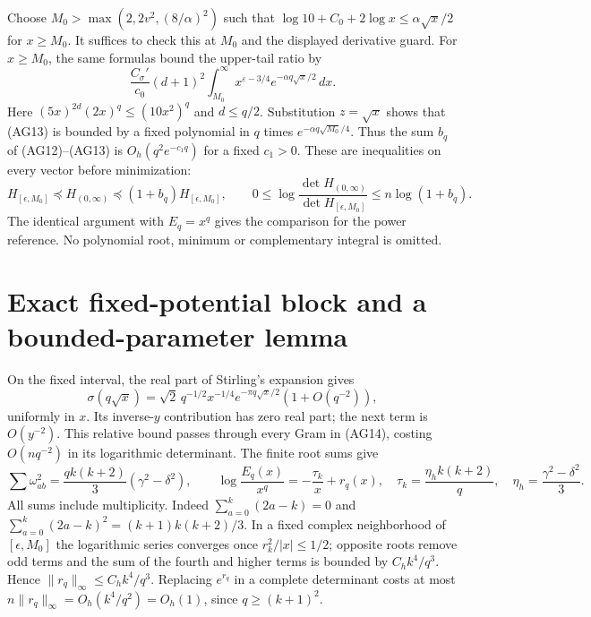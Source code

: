 \documentclass[11pt,a4paper]{article}
\providecommand{\dd}{\,d}
\begin{document}
Choose $M_0>\max(2,2v^2,(8/\alpha)^2)$ such that
$\log10+C_0+2\log x\le\alpha\sqrt x/2$ for $x\ge M_0$.
It suffices to check this at $M_0$ and the displayed derivative guard.
For $x\ge M_0$, the same formulas bound the upper-tail ratio by
\begin{equation}\tag{AG13}
 \frac{C_\sigma'}{c_0}(d+1)^2
 \int_{M_0}^\infty x^{\varepsilon-3/4}
                  e^{-\alpha q\sqrt x/2}\dd x.
\end{equation}
Here $(5x)^{2d}(2x)^q\le(10x^2)^q$ and $d\le q/2$.
Substitution $z=\sqrt x$ shows that (AG13) is bounded by a fixed
polynomial in $q$ times $e^{-\alpha q\sqrt{M_0}/4}$.
Thus the sum $b_q$ of (AG12)--(AG13) is $O_h(q^2e^{-c_1q})$ for a
fixed $c_1>0$. These are inequalities on every vector before minimization:
\begin{equation}\tag{AG14}
 H_{[\epsilon,M_0]}\preceq H_{(0,\infty)}
 \preceq(1+b_q)H_{[\epsilon,M_0]},\qquad
 0\le\log\frac{\det H_{(0,\infty)}}{\det H_{[\epsilon,M_0]}}
 \le n\log(1+b_q).
\end{equation}
The identical argument with $E_q=x^q$ gives the comparison for the power
reference. No polynomial root, minimum or complementary integral is omitted.

\section{Exact fixed-potential block and a bounded-parameter lemma}
On the fixed interval, the real part of Stirling's expansion gives
\begin{equation}\tag{AG15}
 \sigma(q\sqrt x)=\sqrt2\,q^{-1/2}x^{-1/4}
 e^{-\pi q\sqrt x/2}(1+O(q^{-2})),
\end{equation}
uniformly in $x$. Its inverse-$y$ contribution has zero real part;
the next term is $O(y^{-2})$. This relative bound passes through every
Gram in (AG14), costing $O(nq^{-2})$ in its logarithmic determinant.
The finite root sums give
\begin{equation}\tag{AG16}
 \sum\omega_{ab}^2=\frac{qk(k+2)}3(\gamma^2-\delta^2),\qquad
 \log\frac{E_q(x)}{x^q}=-\frac{\tau_k}{x}+r_q(x),
 \quad \tau_k=\frac{\eta_hk(k+2)}q,\quad
 \eta_h=\frac{\gamma^2-\delta^2}3.
\end{equation}
All sums include multiplicity. Indeed
$\sum_{a=0}^k(2a-k)=0$ and
$\sum_{a=0}^k(2a-k)^2=(k+1)k(k+2)/3$.
In a fixed complex neighborhood of $[\epsilon,M_0]$ the logarithmic series
converges once $r_k^2/|x|\le1/2$; opposite roots remove odd terms and the
sum of the fourth and higher terms is bounded by
$C_h k^4/q^3$. Hence $\|r_q\|_\infty\le C_hk^4/q^3$.
Replacing $e^{r_q}$ in a complete determinant costs at most
$n\|r_q\|_\infty=O_h(k^4/q^2)=O_h(1)$, since $q\ge(k+1)^2$.
\end{document}
